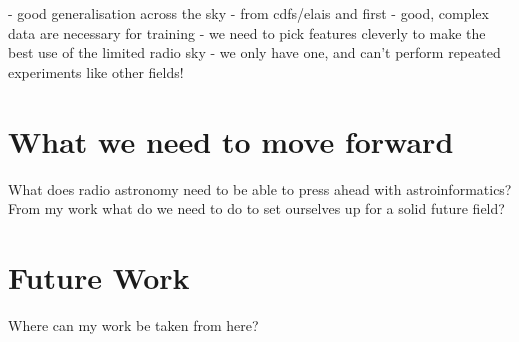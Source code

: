     - good generalisation across the sky - from cdfs/elais and first
    - good, complex data are necessary for training
    - we need to pick features cleverly to make the best use of the limited radio sky - we only have one, and can't perform repeated experiments like other fields!

\section{What we need to move forward}
\label{sec:moving-forward}
    
    What does radio astronomy need to be able to press ahead with astroinformatics? From my work what do we need to do to set ourselves up for a solid future field?

\section{Future Work}
\label{sec:future}

    Where can my work be taken from here?

